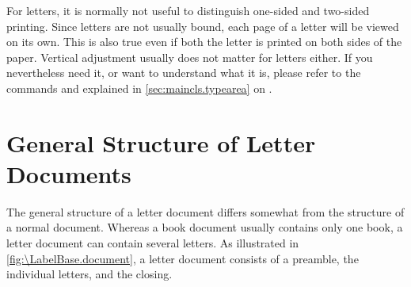 



For letters, it is normally not useful to distinguish one-sided and two-sided
printing. Since letters are not usually bound, each page of a letter will be
viewed on its own. This is also true even if both the letter is printed on
both sides of the paper. Vertical adjustment usually does not matter for
letters either. If you nevertheless need it, or want to understand what it is,
please refer to the commands
 and
 explained in
\autoref{sec:maincls.typearea} on .%
%
\EndIndexGroup


\section{General Structure of Letter Documents}
\BeginIndexGroup
{}

The general structure of a letter document differs somewhat from the structure
of a normal document. Whereas a book document usually contains only one book,
a letter document can contain several letters. As illustrated in
\autoref{fig:\LabelBase.document}, a letter document consists of a preamble,
the individual letters, and the closing.

